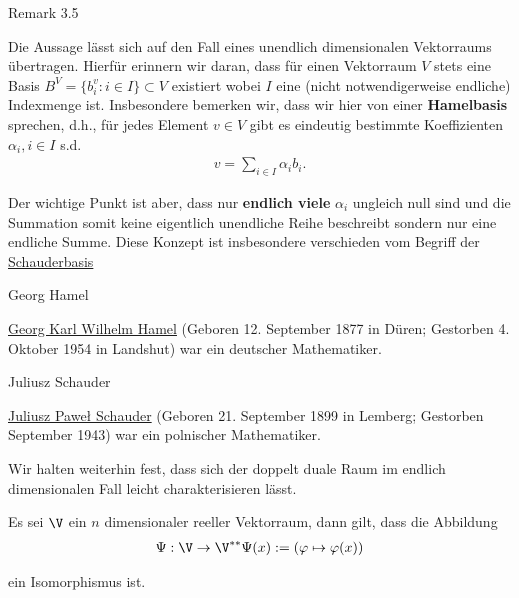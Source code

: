 \label{vektoranalysis/multilinear:remark-11}
\begin{emphBox}{}{}{Remark 3.5}



\par
Die Aussage lässt sich auf den Fall eines unendlich dimensionalen Vektorraums übertragen. Hierfür erinnern wir daran, dass für einen Vektorraum \(V\) stets eine Basis \(B^V = \{b_i^v:i\in I\}\subset V\) existiert wobei \(I\) eine (nicht notwendigerweise endliche) Indexmenge ist. Insbesondere bemerken wir, dass wir hier von einer \textbf{Hamelbasis} sprechen, d.h., für jedes Element \(v\in V\) gibt es eindeutig bestimmte Koeffizienten \(\alpha_i, i\in I\) s.d.
\begin{align*}
v = \sum_{i\in I} \alpha_i b_i.
\end{align*}
\par
Der wichtige Punkt ist aber, dass nur \textbf{endlich viele} \(\alpha_i\) ungleich null sind und die Summation somit keine eigentlich unendliche Reihe beschreibt sondern nur eine endliche Summe. Diese Konzept ist insbesondere verschieden vom Begriff der \href{https://de.wikipedia.org/wiki/Schauderbasis}{Schauderbasis}
\end{emphBox}

\begin{emphBox}{Georg Hamel}{}

\par
\href{https://de.wikipedia.org/wiki/Georg\_Hamel}{Georg Karl Wilhelm Hamel} (Geboren 12. September 1877 in Düren; Gestorben 4. Oktober 1954 in Landshut) war ein deutscher Mathematiker.
\end{emphBox}

\begin{emphBox}{Juliusz Schauder}{}

\par
\href{https://de.wikipedia.org/wiki/Juliusz\_Schauder}{Juliusz Paweł Schauder} (Geboren 21. September 1899 in Lemberg; Gestorben September 1943) war ein polnischer Mathematiker.
\end{emphBox}

\par
Wir halten weiterhin fest, dass sich der doppelt duale Raum im endlich dimensionalen Fall leicht charakterisieren lässt.
\label{vektoranalysis/multilinear:lem:doubledual}
\begin{lemma}{}{}



\par
Es sei \(\V\) ein \(n\) dimensionaler reeller Vektorraum, dann gilt, dass die Abbildung
\begin{align*}
\Psi:\V\rightarrow \V^{\ast\ast}
\Psi(x) := (\varphi\mapsto \varphi(x))
\end{align*}
\par
ein Isomorphismus ist.
\end{lemma}


